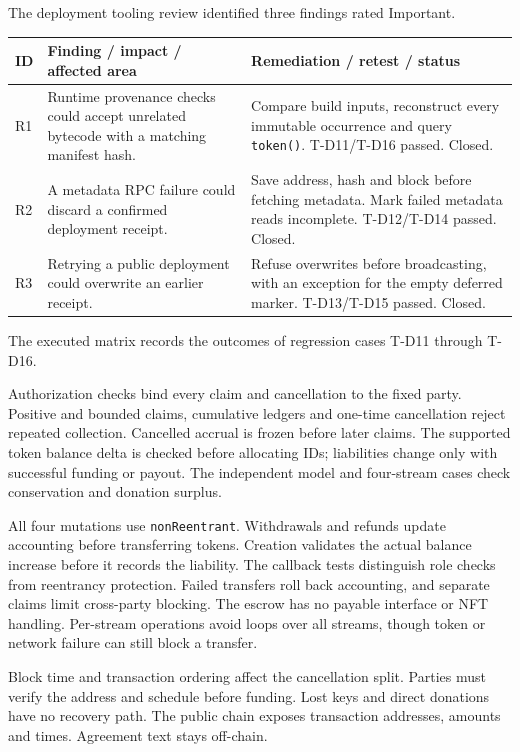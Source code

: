 \documentclass[12pt,a4paper]{report}
\makeatletter
\renewcommand\section{\@startsection{section}{1}{\z@}{-2.25ex\@plus-.4ex\@minus-.2ex}{1.1ex\@plus.2ex}{\normalfont\Large\bfseries}}
\makeatother
\begin{document}
The deployment tooling review identified three findings rated Important.

\begingroup\small
\begin{tabularx}{\linewidth}{@{}P{1.2cm}Y Y@{}}
\toprule
ID & Finding / impact / affected area & Remediation / retest / status\\\midrule
R1 & Runtime provenance checks could accept unrelated bytecode with a matching manifest hash. & Compare build inputs, reconstruct every immutable occurrence and query \texttt{token()}. T-D11/T-D16 passed. Closed.\\
R2 & A metadata RPC failure could discard a confirmed deployment receipt. & Save address, hash and block before fetching metadata. Mark failed metadata reads incomplete. T-D12/T-D14 passed. Closed.\\
R3 & Retrying a public deployment could overwrite an earlier receipt. & Refuse overwrites before broadcasting, with an exception for the empty deferred marker. T-D13/T-D15 passed. Closed.\\
\bottomrule
\end{tabularx}\endgroup

The executed matrix records the outcomes of regression cases T-D11 through T-D16.

\clearpage
\section{Manual Security Review}
Authorization checks bind every claim and cancellation to the fixed party. Positive and bounded claims, cumulative ledgers and one-time cancellation reject repeated collection. Cancelled accrual is frozen before later claims. The supported token balance delta is checked before allocating IDs; liabilities change only with successful funding or payout. The independent model and four-stream cases check conservation and donation surplus.

All four mutations use \texttt{nonReentrant}. Withdrawals and refunds update accounting before transferring tokens. Creation validates the actual balance increase before it records the liability. The callback tests distinguish role checks from reentrancy protection. Failed transfers roll back accounting, and separate claims limit cross-party blocking. The escrow has no payable interface or NFT handling. Per-stream operations avoid loops over all streams, though token or network failure can still block a transfer.

Block time and transaction ordering affect the cancellation split. Parties must verify the address and schedule before funding. Lost keys and direct donations have no recovery path. The public chain exposes transaction addresses, amounts and times. Agreement text stays off-chain.
\end{document}

